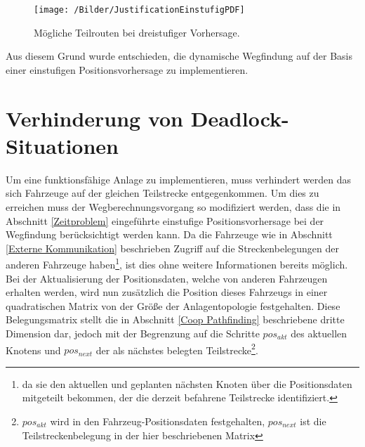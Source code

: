 		\begin{figure}[h]
			\centering
			\texttt{[image: /Bilder/JustificationEinstufigPDF]}
			\vspace{0.2cm}
			\caption{Mögliche Teilrouten bei dreistufiger Vorhersage.}\label{Einstufig}
		\end{figure}
		
		Aus diesem Grund wurde entschieden, die dynamische Wegfindung auf der Basis einer einstufigen Positionsvorhersage zu implementieren.
		
\section{Verhinderung von Deadlock-Situationen}
	\label{Deadlock Verhindern}
	Um eine funktionsfähige Anlage zu implementieren, muss verhindert werden das sich Fahrzeuge auf der gleichen Teilstrecke entgegenkommen. Um dies zu erreichen muss der Wegberechnungsvorgang so modifiziert werden, dass die in Abschnitt \ref{Zeitproblem} eingeführte einstufige Positionsvorhersage bei der Wegfindung berücksichtigt werden kann. Da die Fahrzeuge wie in Abschnitt \ref{Externe Kommunikation} beschrieben Zugriff auf die Streckenbelegungen der anderen Fahrzeuge haben\footnote{da sie den aktuellen und geplanten nächsten Knoten über die Positionsdaten mitgeteilt bekommen, der die derzeit befahrene Teilstrecke identifiziert.}, ist dies ohne weitere Informationen bereits möglich. Bei der Aktualisierung der Positionsdaten, welche von anderen Fahrzeugen erhalten werden, wird nun zusätzlich die Position dieses Fahrzeugs in einer quadratischen Matrix von der Größe der Anlagentopologie festgehalten. Diese Belegungsmatrix stellt die in Abschnitt \ref{Coop Pathfinding} beschriebene dritte Dimension dar, jedoch mit der Begrenzung auf die Schritte $pos_{akt}$ des aktuellen Knotens und $pos_{next}$ der als nächstes belegten Teilstrecke\footnote{$pos_{akt}$ wird in den Fahrzeug-Positionsdaten festgehalten, $pos_{next}$ ist die Teilstreckenbelegung in der hier beschriebenen Matrix}.

